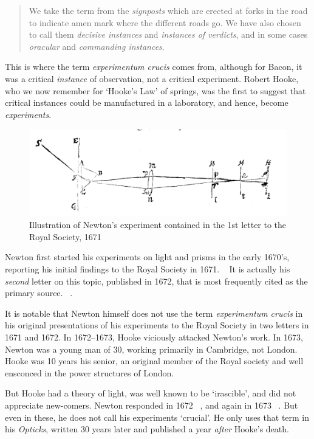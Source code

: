 \begin{refsection}
\begin{quote}
We take the term from the \emph{signposts} which are erected at forks in the road to indicate amen mark where the different roads go. We have also chosen to call them \emph{decisive instances} and \emph{instances of verdicts}, and in some cases \emph{oracular} and \emph{commanding instances}. 
\end{quote}

This is where the term \emph{experimentum crucis} comes from, although for Bacon, it was a critical \emph{instance} of observation, not a critical experiment. Robert Hooke, who we now remember for `Hooke's Law' of springs, was the first to suggest that critical instances could be manufactured in a laboratory, and hence, become \emph{experiments}.

\begin{figure}\includegraphics{../images/newton1671.png}\caption{Illustration of Newton's experiment contained in the 1st letter to the Royal Society, 1671}\label{fig:newton1671}\end{figure}

Newton first started his experiments on light and prisms in the early 1670's, reporting his initial findings to the Royal Society in 1671. ~\citep{Newton:1671uw} It is actually his \emph{second} letter on this topic, published in 1672, that is most frequently cited as the primary source. ~\citep{Newton:1672tm}. 

It is notable that Newton himself does not use the term \emph{experimentum crucis} in his original presentations of his experiments to the Royal Society in two letters in 1671 and 1672. In 1672--1673, Hooke viciously attacked Newton's work. In 1673, Newton was a young man of 30, working primarily in Cambridge, not London. Hooke was 10 years his senior, an original member of the Royal society and well ensconced in the power structures of London.

But Hooke had a theory of light, was well known to be `irascible', and did not appreciate new-comers. Newton responded in 1672 ~\citep{Newton:1672wd}, and again in 1673 ~\citep{Newton:1673tf}. But even in these, he does not call his experiments `crucial'. He only uses that term in his \emph{Opticks}, written 30 years later and published a year \emph{after} Hooke's death. ~\citep{Newton:2018th}


\end{refsection}

